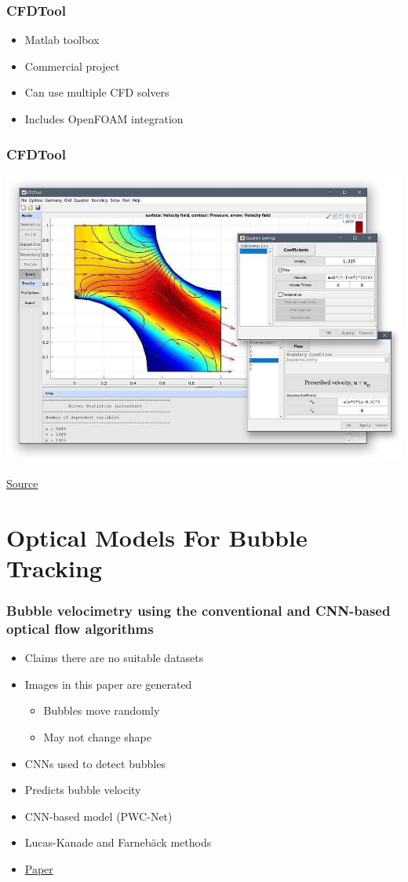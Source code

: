 \documentclass{beamer}
\begin{document}
\begin{frame}
    \frametitle{CFDTool}
    \begin{itemize}
        \item Matlab toolbox
        \item Commercial project
        \item Can use multiple CFD solvers
        \item Includes OpenFOAM integration
    \end{itemize}
\end{frame}

\begin{frame}
    \frametitle{CFDTool}
    \begin{center}
        \includegraphics[width=0.8\columnwidth]{cfdtool}
    \end{center}
    \href{https://github.com/precise-simulation/cfdtool/tree/master}{Source}
\end{frame}



\section {Optical Models For Bubble Tracking}

\begin{frame}
    \frametitle{Bubble velocimetry using the conventional and CNN-based optical flow algorithms}
    \begin{itemize}
        \item Claims there are no suitable datasets
        \item Images in this paper are generated
            \begin{itemize}
                \item Bubbles move randomly
                \item May not change shape
            \end{itemize}
        \item CNNs used to detect bubbles
        \item Predicts bubble velocity
        \item CNN-based model (PWC-Net)
        \item Lucas-Kanade and Farnebäck methods
        \item \href{https://www.nature.com/articles/s41598-022-16145-y}{Paper}
    \end{itemize}
\end{frame}
\end{document}

